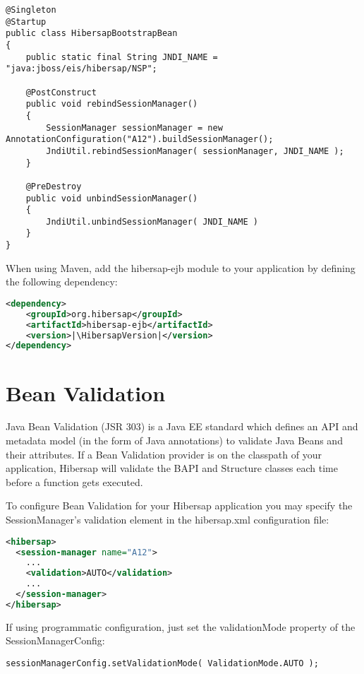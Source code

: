 \begin{lstlisting}
@Singleton
@Startup
public class HibersapBootstrapBean
{
    public static final String JNDI_NAME = "java:jboss/eis/hibersap/NSP";

    @PostConstruct
    public void rebindSessionManager()
    {
        SessionManager sessionManager = new AnnotationConfiguration("A12").buildSessionManager();
        JndiUtil.rebindSessionManager( sessionManager, JNDI_NAME );
    }

    @PreDestroy
    public void unbindSessionManager()
    {
        JndiUtil.unbindSessionManager( JNDI_NAME )
    }
}
\end{lstlisting}

When using Maven, add the hibersap-ejb module to your application by defining the following dependency:

\begin{lstlisting}[language=XML,escapechar=|]
<dependency>
    <groupId>org.hibersap</groupId>
    <artifactId>hibersap-ejb</artifactId>
    <version>|\HibersapVersion|</version>
</dependency>
\end{lstlisting}


\section{Bean Validation}
Java Bean Validation (JSR 303) is a Java EE standard which defines an API and metadata model (in the form of Java annotations) to validate Java Beans and their attributes. If a Bean Validation provider is on the classpath of your application, Hibersap will validate the BAPI and Structure classes each time before a function gets executed.

To configure Bean Validation for your Hibersap application you may specify the SessionManager's validation element in the hibersap.xml configuration file:

\begin{lstlisting}[language=XML]
<hibersap>
  <session-manager name="A12">
    ...
    <validation>AUTO</validation>
    ...
  </session-manager>
</hibersap>
\end{lstlisting}

If using programmatic configuration, just set the validationMode property of the SessionManagerConfig:

\begin{lstlisting}
sessionManagerConfig.setValidationMode( ValidationMode.AUTO );
\end{lstlisting}

